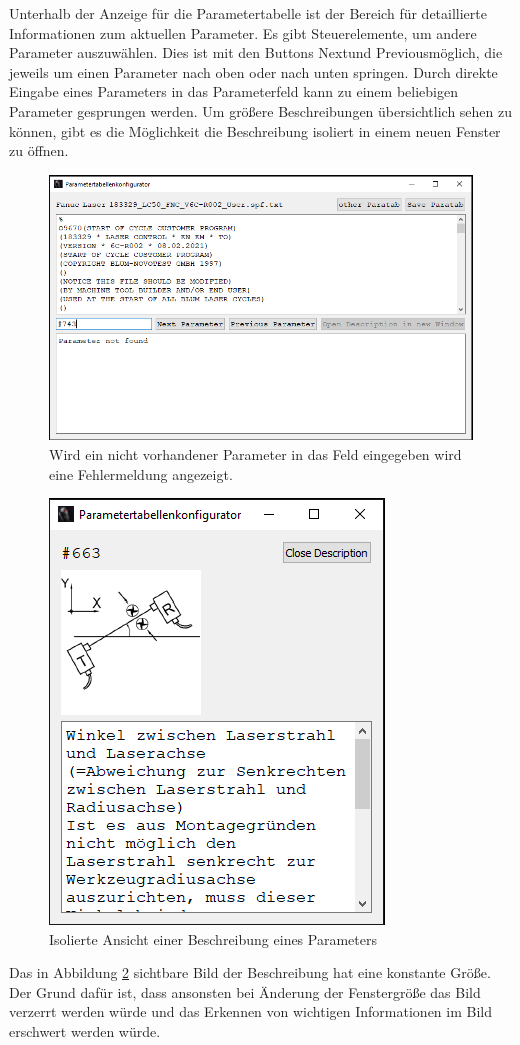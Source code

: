 Unterhalb der Anzeige für die Parametertabelle ist der Bereich für detaillierte Informationen zum aktuellen Parameter. Es gibt Steuerelemente, um andere Parameter auszuwählen. Dies ist mit den Buttons \glqq Next\grqq\space und \glqq Previous\grqq\space möglich, die jeweils um einen Parameter nach oben oder nach unten springen. Durch direkte Eingabe eines Parameters in das Parameterfeld kann zu einem beliebigen Parameter gesprungen werden. Um größere Beschreibungen übersichtlich sehen zu können, gibt es die Möglichkeit die Beschreibung isoliert in einem neuen Fenster zu öffnen.\\
\begin{figure}[H]
\includegraphics[scale=0.6]{pictures_and_research/Bilder/fehlermeldung_invalid_parameter.PNG}
\caption{Wird ein nicht vorhandener Parameter in das Feld eingegeben wird eine Fehlermeldung angezeigt.}
\label{fig:paraError}
\end{figure}
\begin{figure}[H]
\includegraphics[scale=1]{pictures_and_research/Bilder/descriptW.PNG}
\caption{Isolierte Ansicht einer Beschreibung eines Parameters}
\label{fig:descript}
\end{figure}\noindent
Das in Abbildung \ref{fig:descript} sichtbare Bild der Beschreibung hat eine konstante Größe. Der Grund dafür ist, dass ansonsten bei Änderung der Fenstergröße das Bild verzerrt werden würde und das Erkennen von wichtigen Informationen im Bild erschwert werden würde.
